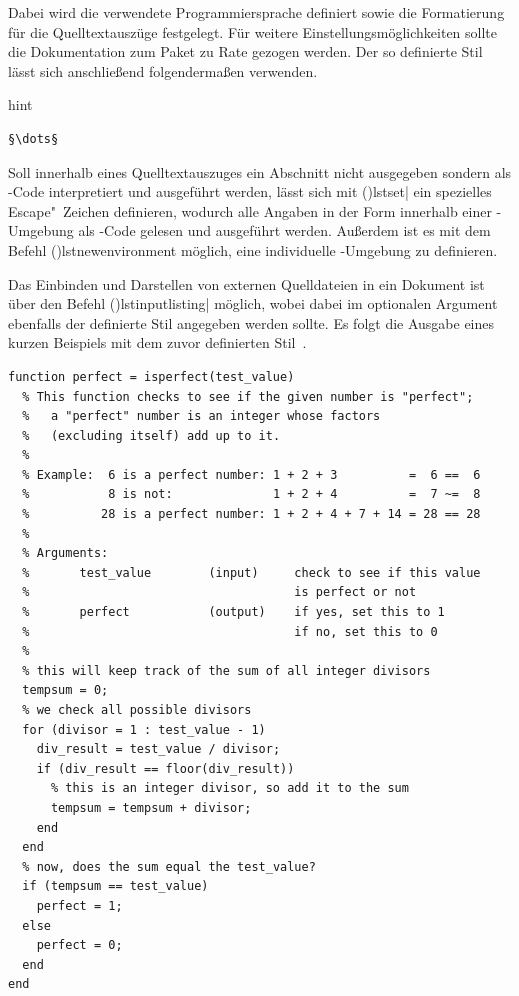 \documentclass[%
  english,ngerman,%
  cdgeometry=no,DIV=12,%
  cd=false,cdfont=false,cdtitle=true,%
  headings=normal,%
  automark,%
  listof=toc,%
]{tudscrartcl}
\begin{document}
Dabei wird die verwendete Programmiersprache definiert sowie die Formatierung 
für die Quelltextauszüge festgelegt. Für weitere Einstellungsmöglichkeiten 
sollte die Dokumentation zum Paket zu Rate gezogen werden. Der so definierte 
Stil lässt sich anschließend folgendermaßen verwenden.
%
\begin{Code}{hint}
\begin{lstlisting}[style=matlab]
§\dots§
\end{lstlisting}
\end{Code}

Soll innerhalb eines Quelltextauszuges ein Abschnitt nicht ausgegeben sondern 
als -Code interpretiert und ausgeführt werden, lässt sich mit 
\Macro(){lstset|}
ein spezielles Escape"~Zeichen definieren, wodurch alle Angaben in der Form 
\PValue{\dots} innerhalb einer 
-Umgebung als -Code gelesen und 
ausgeführt werden. Außerdem ist es mit dem Befehl 
\Macro(){lstnewenvironment} möglich, eine individuelle 
-Umgebung zu definieren.

Das Einbinden und Darstellen von externen Quelldateien in ein Dokument ist über 
den Befehl \Macro(){lstinputlisting|\OList{}} 
möglich, wobei dabei im optionalen Argument ebenfalls der definierte Stil 
angegeben werden sollte. Es folgt die Ausgabe eines kurzen Beispiels mit dem 
zuvor definierten Stil~.
%
\begin{lstlisting}[style=matlab]
function perfect = isperfect(test_value)
  % This function checks to see if the given number is "perfect";
  %   a "perfect" number is an integer whose factors 
  %   (excluding itself) add up to it.
  %
  % Example:  6 is a perfect number: 1 + 2 + 3          =  6 ==  6
  %           8 is not:              1 + 2 + 4          =  7 ~=  8
  %          28 is a perfect number: 1 + 2 + 4 + 7 + 14 = 28 == 28
  %
  % Arguments:
  %       test_value        (input)     check to see if this value 
  %                                     is perfect or not
  %       perfect           (output)    if yes, set this to 1
  %                                     if no, set this to 0
  %
  % this will keep track of the sum of all integer divisors
  tempsum = 0;
  % we check all possible divisors
  for (divisor = 1 : test_value - 1)
    div_result = test_value / divisor;
    if (div_result == floor(div_result)) 
      % this is an integer divisor, so add it to the sum
      tempsum = tempsum + divisor;
    end
  end
  % now, does the sum equal the test_value?
  if (tempsum == test_value) 
    perfect = 1;
  else
    perfect = 0;
  end
end
\end{lstlisting}
\end{document}
